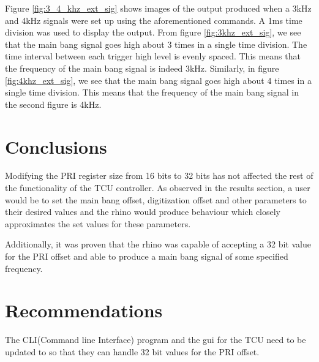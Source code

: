 \documentclass[12pt, a4paper]{article}
\begin{document}
Figure \ref{fig:3_4_khz_ext_sig} shows images of the output produced when a 3kHz and 4kHz signals were set up using the aforementioned commands. A 1ms time division was used to display the output. From figure \ref{fig:3khz_ext_sig}, we see that the main bang signal goes high about 3 times in a single time division. The time interval between each trigger high level is evenly spaced. This means that the frequency of the main bang signal is indeed 3kHz. Similarly, in figure \ref{fig:4khz_ext_sig}, we see that the main bang signal goes high about 4 times in a single time division. This means that the frequency of the main bang signal in the second figure is 4kHz.

\section{Conclusions}


Modifying the PRI register size from 16 bits to 32 bits has not affected the rest of the functionality of the TCU controller. As observed in the results section, a user would be to set the main bang offset, digitization offset and other parameters to their desired values and the rhino would produce behaviour which closely approximates the set values for these parameters.

Additionally, it was proven that the rhino was capable of accepting a 32 bit value for the PRI offset and able to produce a main bang signal of some specified frequency.

\section{Recommendations}


The CLI(Command line Interface) program and the gui for the TCU need to be updated to so that they can handle 32 bit values for the PRI offset.
\end{document}
